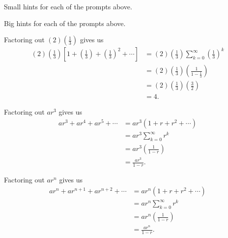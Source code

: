 \begin{smallhint}
\ba
	\item Small hints for each of the prompts above.
\ea
\end{smallhint}
\begin{bighint}
\ba
	\item Big hints for each of the prompts above.
\ea
\end{bighint}
\begin{activitySolution}
\ba
	\item Factoring out $(2)\left(\frac{1}{3}\right)$ gives us
\begin{align*}
(2)\left(\frac{1}{3}\right) \left[1 + \left(\frac{1}{3}\right) + \left(\frac{1}{3}\right)^2 + \cdots \right] &= (2)\left(\frac{1}{3}\right)\sum_{k=0}^{\infty} \left(\frac{1}{3}\right)^k \\
    &= (2)\left(\frac{1}{3}\right) \left(\frac{1}{1-\frac{1}{3}}\right) \\
    &= (2)\left(\frac{1}{3}\right) \left(\frac{3}{2}\right)\\
    &=  4.
\end{align*}
    \item Factoring out $ar^3$ gives us
\begin{align*}
ar^3+ar^4+ar^5 + \cdots &= ar^3\left(1+r+r^2+ \cdots \right) \\
    &= ar^3\sum_{k=0}^{\infty} r^k \\
    &= ar^3 \left(\frac{1}{1-r}\right) \\
    &= \frac{ar^3}{1-r}.
\end{align*}
    \item Factoring out $ar^n$ gives us
\begin{align*}
ar^n+ar^{n+1}+ar^{n+2} + \cdots &= ar^n\left(1+r+r^2+ \cdots \right) \\
    &= ar^n\sum_{k=0}^{\infty} r^k \\
    &= ar^n \left(\frac{1}{1-r}\right) \\
    &= \frac{ar^n}{1-r}.
\end{align*}
\ea
\end{activitySolution}
\aftera 